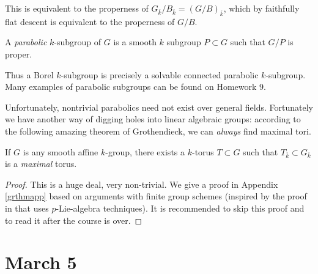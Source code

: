 \documentclass[10pt]{article}
\renewcommand{\(}{\left(}
\renewcommand{\)}{\right)}
\numberwithin{thm}{subsection}
\begin{document}
This is equivalent to the properness of $G_{\overline{k}}/B_{\overline{k}}=
(G/B)_{\overline{k}}$, which by faithfully flat
descent is equivalent to the properness
of $G/B$.
\begin{defn}\label{}
A \textit{parabolic} $k$-subgroup of $G$
is a smooth $k$ subgroup $P\subset G$
such that $G/P$ is proper.
\end{defn}
Thus a Borel $k$-subgroup
is precisely a solvable connected parabolic $k$-subgroup.
Many examples of parabolic subgroups can be found on Homework 9.

Unfortunately, nontrivial parabolics need not exist over general fields.
Fortunately we have another way of digging holes into linear algebraic groups:
according to the following amazing theorem of Grothendieck, we can \textit{always} find maximal tori.
\begin{thm}[Grothendieck]\label{geometricallymaximaltoriexist}
If $G$ is any smooth affine $k$-group,
there exists a $k$-torus $T\subset G$
such that $T_{\overline{k}}\subset G_{\overline{k}}$ is a \textit{maximal}
torus.
\end{thm}
\begin{proof}
This is a huge deal, very non-trivial.  We give a proof in Appendix \ref{grthmapp} based on arguments with finite group
schemes (inspired by the proof in \cite[18.2(i)]{borel} that uses $p$-Lie-algebra techniques). It is
recommended to skip this proof and to read it after the course is over.
\end{proof}

\section{March 5}
\end{document}
